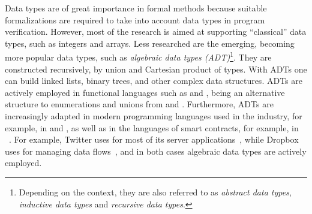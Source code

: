 Data types are of great importance in formal methods because suitable formalizations are required to take into account data types in program verification. However, most of the research is aimed at supporting ``classical'' data types, such as integers and arrays. Less researched are the emerging, becoming more popular data types, such as \emph{algebraic data types (ADT)}\footnote{Depending on the context, they are also referred to as \emph{abstract data types}, \emph{inductive data types} and \emph{recursive data types}.}.
They are constructed recursively, by union and Cartesian product of types. With ADTs one can build linked lists, binary trees, and other complex data structures. ADTs are actively employed in functional languages such as \haskell{} and \ocaml{}, being an alternative structure to enumerations and unions from \clanguage{} and \cplusplus{}. Furthermore, ADTs are increasingly adapted in modern programming languages used in the industry, for example, in \rust{} and \scala{}, as well as in the languages of smart contracts, for example, in \solidity{}~\cite{8327565}. For example, Twitter uses \scala{} for most of its server applications~\cite{10.1145/1900160.1900170}, while Dropbox uses \rust{} for managing data flows~\cite{dropboxRust}, and in both cases algebraic data types are actively employed.

